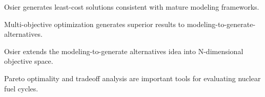 \begin{highlights}
       \item Osier generates least-cost solutions consistent with mature modeling frameworks.
       \item Multi-objective optimization generates superior results to modeling-to-generate-alternatives.
       \item Osier extends the modeling-to-generate alternatives idea into N-dimensional objective space.
       \item Pareto optimality and tradeoff analysis are important tools for evaluating nuclear fuel cycles.
\end{highlights}
